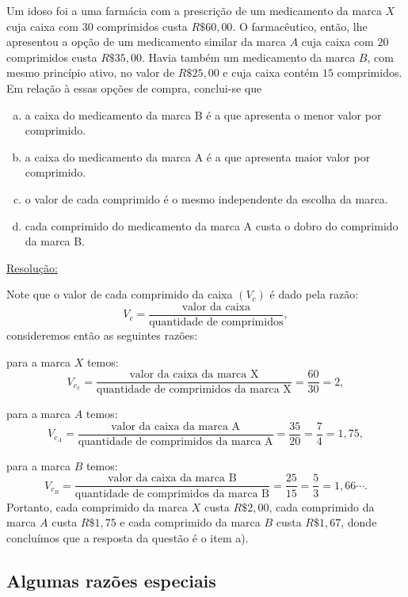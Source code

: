 \begin{exem}[Comperve - 2018]
 Um idoso foi a uma farmácia com a prescrição de um medicamento da marca $X$ cuja caixa com $30$ comprimidos custa $R\$ 60,00$. O farmacêutico, então, lhe apresentou a opção de um medicamento similar da marca $A$ cuja caixa com $20$ comprimidos custa $R\$ 35,00$. Havia também um medicamento da marca $B$, com mesmo princípio ativo, no valor de $R\$ 25,00$ e cuja caixa contém $15$ comprimidos. Em relação à essas opções de compra, conclui-se que

 \begin{enumerate}[a)]
  \item a caixa do medicamento da marca B é a que apresenta o menor valor por comprimido.
  \item a caixa do medicamento da marca A é a que apresenta maior valor por comprimido.
  \item o valor de cada comprimido é o mesmo independente da escolha da marca.
  \item cada comprimido do medicamento da marca A custa o dobro do comprimido da marca B.
 \end{enumerate}

\underline{Resolução:}

  Note que o valor de cada comprimido da caixa $(V_c)$ é dado pela razão:
  \[V_c= \frac{\text{valor da caixa}}{\text{quantidade de comprimidos}} ,\]
  consideremos então as seguintes razões:

  para a marca $X$ temos:
  \[V_{c_x}=\frac{\text{valor da caixa da marca X}}{\text{quantidade de comprimidos da marca X}}= \frac{60}{30}= 2 ,\]

  para a marca $A$ temos:
   \[V_{c_A}=\frac{\text{valor da caixa da marca A}}{\text{quantidade de comprimidos da marca A}}= \frac{35}{20}= \frac{7}{4}= 1,75 ,\]

  para a marca $B$ temos:
  \[V_{c_B}=\frac{\text{valor da caixa da marca B}}{\text{quantidade de comprimidos da marca B}} = \frac{25}{15}= \frac{5}{3}= 1,66 \cdots .\]
  Portanto, cada comprimido da marca $X$ custa $R\$ 2,00$, cada comprimido da marca $A$ custa $R\$ 1,75$ e cada comprimido da marca $B$ custa $R\$ 1,67$, donde concluímos que a resposta da questão é o item a).

  \fim
\end{exem}



\subsection{Algumas razões especiais}

